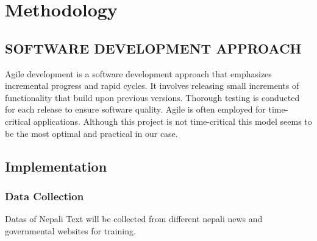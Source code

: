     \chapter{Methodology}
       \section{SOFTWARE DEVELOPMENT APPROACH}
       Agile development is a software development approach that emphasizes incremental progress and rapid cycles. It involves releasing small increments of functionality that build upon previous versions. Thorough testing is conducted for each release to ensure software quality. Agile is often employed for time-critical applications. Although this project is not time-critical this model seems to be the most optimal and practical in our case.
       \begin{figure}[hbt!]
       \end{figure}
       
       \section{Implementation}

       \subsection{Data Collection}
       Datas of Nepali Text will be collected from different nepali news and governmental websites for training.
       


